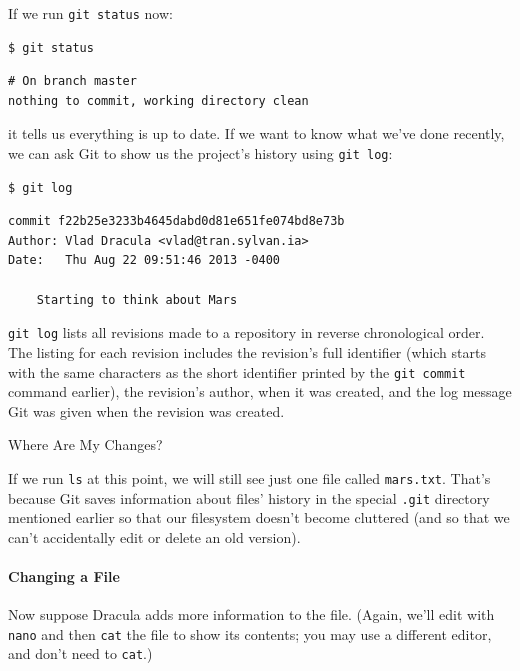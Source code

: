 \documentclass{book}
\begin{document}
If we run \texttt{git status} now:

\begin{verbatim}
$ git status
\end{verbatim}

\begin{verbatim}
# On branch master
nothing to commit, working directory clean
\end{verbatim}

it tells us everything is up to date. If we want to know what we've done
recently, we can ask Git to show us the project's history using
\texttt{git log}:

\begin{verbatim}
$ git log
\end{verbatim}

\begin{verbatim}
commit f22b25e3233b4645dabd0d81e651fe074bd8e73b
Author: Vlad Dracula <vlad@tran.sylvan.ia>
Date:   Thu Aug 22 09:51:46 2013 -0400

    Starting to think about Mars
\end{verbatim}

\texttt{git log} lists all revisions made to a repository in reverse
chronological order. The listing for each revision includes the
revision's full identifier (which starts with the same characters as the
short identifier printed by the \texttt{git commit} command earlier),
the revision's author, when it was created, and the log message Git was
given when the revision was created.

\begin{swcbox}{Where Are My Changes?}

If we run \texttt{ls} at this point, we will still see just one file
called \texttt{mars.txt}. That's because Git saves information about
files' history in the special \texttt{.git} directory mentioned earlier
so that our filesystem doesn't become cluttered (and so that we can't
accidentally edit or delete an old version).

\end{swcbox}

\mbox{}\paragraph{Changing a File}

Now suppose Dracula adds more information to the file. (Again, we'll
edit with \texttt{nano} and then \texttt{cat} the file to show its
contents; you may use a different editor, and don't need to
\texttt{cat}.)
\end{document}
